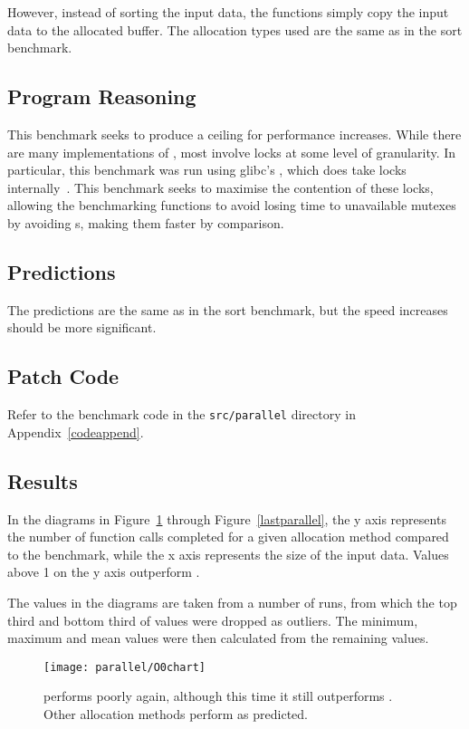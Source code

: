 However, instead of sorting the input data, the functions simply copy the input data to the allocated buffer. The allocation types used are the same as in the sort benchmark.

\subsection{Program Reasoning}

This benchmark seeks to produce a ceiling for performance increases. While there are many implementations of \malloc{}, most involve locks at some level of granularity. In particular, this benchmark was run using glibc's \malloc{}, which does take locks internally~\cite{glibcmalloc}. This benchmark seeks to maximise the contention of these locks, allowing the benchmarking functions to avoid losing time to unavailable mutexes by avoiding \malloc{}s, making them faster by comparison.

\subsection{Predictions}

The predictions are the same as in the sort benchmark, but the speed increases should be more significant.

\subsection{Patch Code}

Refer to the benchmark code in the \texttt{src/parallel} directory in Appendix~\ref{codeappend}.

\subsection{Results}

In the diagrams in Figure~\ref{firstparallel} through Figure~\ref{lastparallel}, the y axis represents the number of function calls completed for a given allocation method compared to the  benchmark, while the x axis represents the size of the input data. Values above 1 on the y axis outperform \malloc{}.

The values in the diagrams are taken from a number of runs, from which the top third and bottom third of values were dropped as outliers. The minimum, maximum and mean values were then calculated from the remaining values.

\begin{figure}[h]
	\centering
	\texttt{[image: parallel/O0chart]}
	\caption{ performs poorly again, although this time it still outperforms . Other allocation methods perform as predicted.}\label{firstparallel}
\end{figure}


